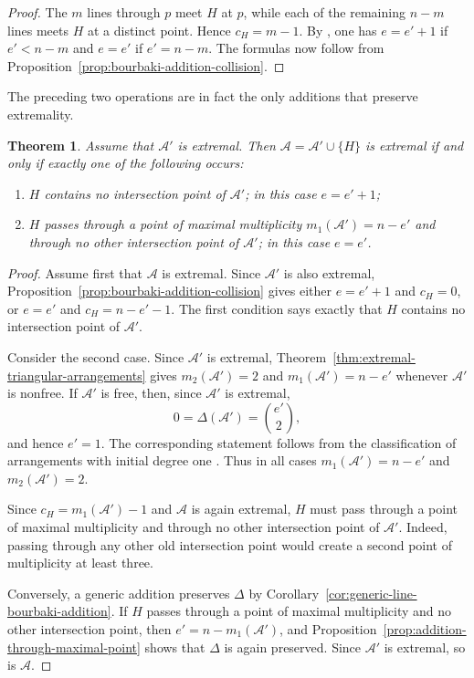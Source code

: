 \documentclass[11pt]{amsart}   %
\newtheorem{Theorem}{Theorem}[section]
\theoremstyle{definition}
\def\A{{\mathcal A}}
\begin{document}
\begin{proof}
The $m$ lines through $p$ meet $H$ at $p$, while each of the remaining $n-m$ lines meets $H$ at a distinct point. Hence $c_H=m-1$. By \cite[Proposition~4.14]{Abe-Dimca-Stic}, one has $e=e'+1$ if $e'<n-m$ and $e=e'$ if $e'=n-m$. The formulas now follow from Proposition~\ref{prop:bourbaki-addition-collision}.
\end{proof}

The preceding two operations are in fact the only additions that preserve extremality.

\begin{Theorem}
\label{thm:extremal-addition-characterization}
Assume that $\A'$ is extremal. Then $\A=\A'\cup\{H\}$ is extremal if and only if exactly one of the following occurs:
\begin{enumerate}
\item $H$ contains no intersection point of $\A'$; in this case
$e=e'+1$;

\item $H$ passes through a point of maximal multiplicity
$m_1(\A')=n-e'$ and through no other intersection point of $\A'$; in this case $e=e'$.
\end{enumerate}
\end{Theorem}

\begin{proof}
Assume first that $\A$ is extremal. Since $\A'$ is also extremal, Proposition~\ref{prop:bourbaki-addition-collision} gives either $e=e'+1$ and $c_H=0$, or $e=e'$ and $c_H=n-e'-1$. The first condition says exactly that $H$ contains no intersection point of $\A'$.

Consider the second case. Since $\A'$ is extremal, Theorem~\ref{thm:extremal-triangular-arrangements} gives $m_2(\A')=2$ and $m_1(\A')=n-e'$ whenever $\A'$ is nonfree. If $\A'$ is free, then, since $\A'$ is extremal,
\[
0=\Delta(\A')=\binom{e'}2,
\]
and hence $e'=1$. The corresponding statement follows from the
classification of arrangements with initial degree one
\cite[Proposition~4.7]{Dimca-Ibadula-Macinic}. Thus in all cases $m_1(\A')=n-e'$ and $m_2(\A')=2$.

Since $c_H=m_1(\A')-1$ and $\A$ is again extremal, $H$ must pass through a point of maximal multiplicity and through no other intersection point of $\A'$. Indeed, passing through any other old intersection point would create a second point of multiplicity at least three.

Conversely, a generic addition preserves $\Delta$ by Corollary~\ref{cor:generic-line-bourbaki-addition}. If $H$ passes through a point of maximal multiplicity and no other intersection point, then $e'=n-m_1(\A')$, and Proposition~\ref{prop:addition-through-maximal-point} shows that $\Delta$ is again preserved. Since $\A'$ is extremal, so is $\A$.
\end{proof}
\end{document}
